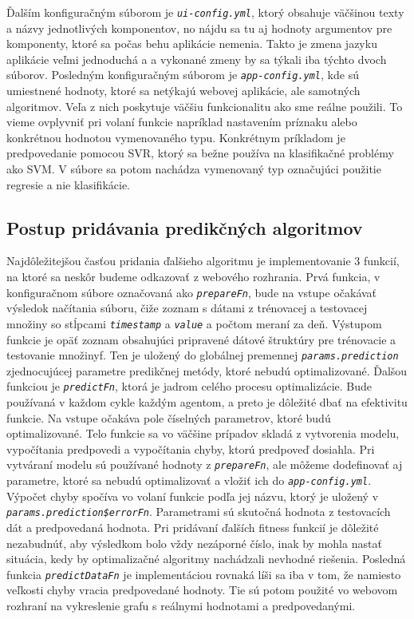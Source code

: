 \documentclass[a4paper,slovak,12pt,appendix]{article}
\begin{document}
Ďalším konfiguračným súborom je \texttt{\textit{ui-config.yml}}, ktorý obsahuje väčšinou
texty a názvy jednotlivých komponentov, no nájdu sa tu aj hodnoty argumentov
pre komponenty, ktoré sa počas behu aplikácie nemenia. Takto je zmena jazyku
aplikácie veľmi jednoduchá a a vykonané zmeny by sa týkali iba týchto dvoch
súborov. Posledným konfiguračným súborom je \texttt{\textit{app-config.yml}}, kde sú
umiestnené hodnoty, ktoré sa netýkajú webovej aplikácie, ale samotných
algoritmov. Veľa z nich poskytuje väčšiu funkcionalitu ako sme reálne použili.
To vieme ovplyvniť pri volaní funkcie napríklad nastavením príznaku alebo
konkrétnou hodnotou vymenovaného typu. Konkrétnym príkladom je predpovedanie
pomocou SVR, ktorý sa bežne používa na klasifikačné problémy ako SVM. V súbore
sa potom nachádza vymenovaný typ označujúci použitie regresie a nie klasifikácie.


\subsection{Postup pridávania predikčných algoritmov}
Najdôležitejšou časťou pridania ďalšieho algoritmu je implementovanie 3 funkcií,
na ktoré sa neskôr budeme odkazovať z webového rozhrania. Prvá funkcia,
v konfiguračnom súbore označovaná ako \texttt{\textit{prepareFn}}, bude na vstupe očakávať
výsledok načítania súboru, čiže zoznam s dátami z trénovacej a testovacej
množiny so stĺpcami \texttt{\textit{timestamp}} a \texttt{\textit{value}} a počtom meraní za deň. Výstupom
funkcie je opäť zoznam obsahujúci pripravené dátové štruktúry pre trénovacie
a testovanie množinyf. Ten je uložený do globálnej premennej
\texttt{\textit{params.prediction}} zjednocujúcej parametre predikčnej metódy, ktoré nebudú
optimalizované. Ďalšou funkciou je \texttt{\textit{predictFn}}, ktorá je jadrom celého procesu
optimalizácie. Bude používaná v každom cykle každým agentom, a preto je dôležité
dbať na efektivitu funkcie. Na vstupe očakáva pole číselných parametrov, ktoré
budú optimalizované. Telo funkcie sa vo väčšine prípadov skladá z vytvorenia
modelu, vypočítania predpovedi a vypočítania chyby, ktorú predpoveď dosiahla.
Pri vytváraní modelu sú používané hodnoty z \texttt{\textit{prepareFn}}, ale môžeme
dodefinovať aj parametre, ktoré sa nebudú optimalizovať a vložiť ich do
\texttt{\textit{app-config.yml}}. Výpočet chyby spočíva vo volaní funkcie podľa jej názvu,
ktorý je uložený v \texttt{\textit{params.prediction\$errorFn}}. Parametrami sú skutočná
hodnota z testovacích dát a predpovedaná hodnota. Pri pridávaní ďalších fitness
funkcií je dôležité nezabudnúť, aby výsledkom bolo vždy nezáporné číslo, inak by
mohla nastať situácia, kedy by optimalizačné algoritmy nachádzali nevhodné
riešenia. Posledná funkcia \texttt{\textit{predictDataFn}} je implementáciou rovnaká líši sa
iba v tom, že namiesto veľkosti chyby vracia predpovedané hodnoty. Tie sú potom
použité vo webovom rozhraní na vykreslenie grafu s reálnymi hodnotami a
predpovedanými.
\end{document}
